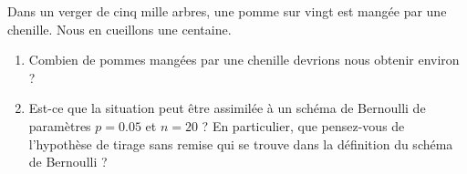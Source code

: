 
\begin{exercice}\label{exoPremiere-0082}

    Dans un verger de cinq mille arbres, une pomme sur vingt est mangée par une chenille. Nous en cueillons une centaine.
    \begin{enumerate}
        \item
            Combien de pommes mangées par une chenille devrions nous obtenir environ ?
        \item
            Est-ce que la situation peut être assimilée à un schéma de Bernoulli de paramètres \( p=0.05\) et \( n=20\) ? En particulier, que pensez-vous de l'hypothèse de tirage sans remise qui se trouve dans la définition du schéma de Bernoulli ?
    \end{enumerate}

\end{exercice}
